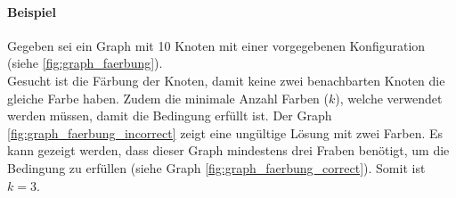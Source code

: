 	\paragraph{Beispiel}
	Gegeben sei ein Graph mit 10 Knoten mit einer vorgegebenen Konfiguration (siehe \autoref{fig:graph_faerbung}).\\
	Gesucht ist die Färbung der Knoten, damit keine zwei benachbarten Knoten die gleiche Farbe haben. Zudem die minimale Anzahl Farben ($k$), welche verwendet werden müssen, damit 
	die Bedingung erfüllt ist. Der Graph \ref{fig:graph_faerbung_incorrect} zeigt eine ungültige Lösung mit zwei Farben. Es kann gezeigt werden, dass dieser Graph 
	mindestens drei Fraben benötigt, um die Bedingung zu erfüllen (siehe Graph \ref{fig:graph_faerbung_correct}). Somit ist $k=3$.
\begin{figure}[ht]
\centering
{}
\end{figure}
